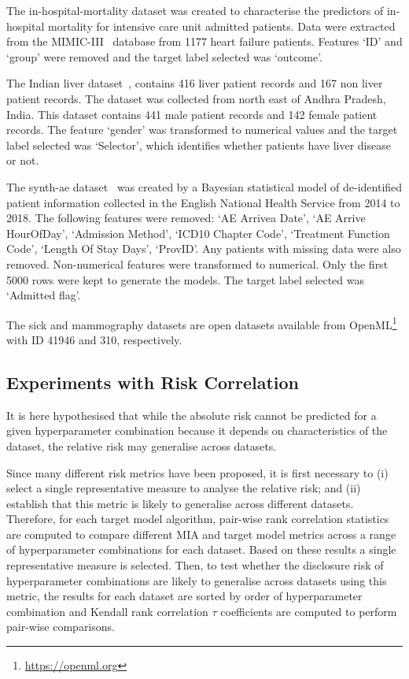 The in-hospital-mortality dataset was created to characterise the predictors of in-hospital mortality for intensive care unit admitted patients. Data were extracted from the MIMIC-III~\cite{Zhou:2021} database from 1177 heart failure patients. Features `ID' and `group' were removed and the target label selected was `outcome'. 
 
The Indian liver dataset~\cite{Ramana:2022}, contains 416 liver patient records and 167 non liver patient records. The dataset was collected from north east of Andhra Pradesh, India. This dataset contains 441 male patient records and 142 female patient records. The feature `gender' was transformed to numerical values and the target label selected was ‘Selector’, which identifies whether patients have liver disease or not. 
 
The synth-ae dataset~\cite{SyntheticData} was created by a Bayesian statistical model of de-identified patient information collected in the English National Health Service from 2014 to 2018. The following features were removed: `AE Arrivea Date', `AE Arrive HourOfDay', `Admission Method', `ICD10 Chapter Code', `Treatment Function Code', `Length Of Stay Days', `ProvID'. Any patients with missing data were also removed. Non-numerical features were transformed to numerical. Only the first 5000 rows were kept to generate the models. The target label selected was `Admitted flag'.

The sick and mammography datasets are open datasets available from OpenML\footnote{\url{https://openml.org}} with ID 41946 and 310, respectively.

\subsection{Experiments with Risk Correlation}

It is here hypothesised that while the absolute risk cannot be predicted for a given hyperparameter combination because it depends on characteristics of the dataset, the relative risk may generalise across datasets.

Since many different risk metrics have been proposed, it is first necessary to (i) select a single representative measure to analyse the relative risk; and (ii) establish that this metric is likely to generalise across different datasets. Therefore, for each target model algorithm, pair-wise rank correlation statistics are computed to compare different MIA and target model metrics across a range of hyperparameter combinations for each dataset. Based on these results a single representative measure is selected. Then, to test whether the disclosure risk of hyperparameter combinations are likely to generalise across datasets using this metric, the results for each dataset are sorted by order of hyperparameter combination and Kendall rank correlation $\tau$ coefficients are computed to perform pair-wise comparisons.

